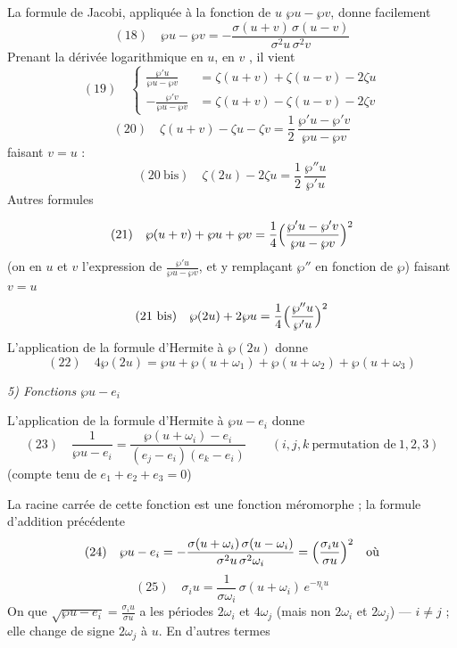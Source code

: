 \documentclass[11pt,a4paper]{article}
\begin{document}
La formule de Jacobi, appliquée à la fonction de $u$ $\wp u - \wp v$, donne
facilement
\[
(18)\quad \wp u - \wp v = -\frac{\sigma(u+v)\,\sigma(u-v)}{\sigma^2 u\,\sigma^2 v}
\]
Prenant la dérivée logarithmique en $u$, en $v$ \ill{} \ill{}, il vient
\[
(19)\quad \left\lbrace
\begin{aligned}
\frac{\wp' u}{\wp u - \wp v} &= \zeta(u+v) + \zeta(u-v) - 2\zeta u\\
-\frac{\wp' v}{\wp u - \wp v} &= \zeta(u+v) - \zeta(u-v) - 2\zeta v
\end{aligned}
\right.
\]
\[
(20)\quad \zeta(u+v) - \zeta u - \zeta v = \frac{1}{2}\,\frac{\wp' u - \wp' v}{\wp u - \wp v}
\]
faisant $v=u$ :
\[
(20\ \mathrm{bis})\quad \zeta(2u) - 2\zeta u = \frac{1}{2}\,\frac{\wp'' u}{\wp' u}
\]
Autres formules

\[
(21)\quad \wp(u+v) + \wp u + \wp v = \frac{1}{4}\Bigl(\frac{\wp' u - \wp' v}{\wp u - \wp v}\Bigr)^2
\]
(on  en $u$ et $v$ \ill{} l'expression de
$\frac{\wp' u}{\wp u - \wp v}$, et y remplaçant $\wp''$ en fonction de $\wp$)
faisant $v=u$
\[
(21\ \mathrm{bis})\quad \wp(2u) + 2\wp u = \frac{1}{4}\Bigl(\frac{\wp'' u}{\wp' u}\Bigr)^2
\]
L'application de la formule d'Hermite à $\wp(2u)$ donne
\[
(22)\quad 4\wp(2u) = \wp u + \wp(u+\omega_1) + \wp(u+\omega_2) + \wp(u+\omega_3)
\]

\emph{5) Fonctions $\wp u - e_i$}

L'application de la formule d'Hermite à $\wp u - e_i$ donne
\[
(23)\quad \frac{1}{\wp u - e_i} = \frac{\wp(u+\omega_i) - e_i}{(e_j - e_i)(e_k - e_i)}
\qquad (i,j,k \ \text{permutation de}\ 1,2,3)
\]
(compte tenu de $e_1 + e_2 + e_3 = 0$)

La racine carrée de cette fonction est une fonction \ill{} méromorphe ; la
formule d'addition précédente \ill{}
\[
(24)\quad \wp u - e_i = -\frac{\sigma(u+\omega_i)\,\sigma(u-\omega_i)}{\sigma^2 u\,\sigma^2\omega_i}
= \Bigl(\frac{\sigma_i u}{\sigma u}\Bigr)^2 \quad\text{où}
\]
\[
(25)\quad \sigma_i u = \frac{1}{\sigma\omega_i}\,\sigma(u+\omega_i)\,e^{-\eta_i u}
\]
On  que $\sqrt{\wp u - e_i} = \frac{\sigma_i u}{\sigma u}$ a les
périodes $2\omega_i$ et $4\omega_j$ (mais non $2\omega_i$ et $2\omega_j$) --- $i\neq j$ ;
elle change de signe  $2\omega_j$ à $u$. En
d'autres termes
\end{document}
